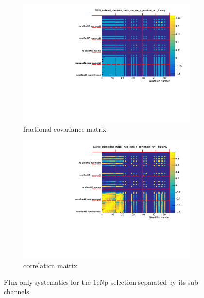 \documentclass[a4paper]{article}
\begin{document}
\begin{figure}[ht] 
\begin{center}
    \begin{subfigure}[b]{0.45\textwidth}
    \centering
    \includegraphics[width=1.00\textwidth]{CovarianceMatrices/SBNfit_fractional_covariance_matrix_nue_reco_e_genietune_run1_fluxonly.pdf}
    \caption{fractional covariance matrix}
    \end{subfigure}
    \begin{subfigure}[b]{0.45\textwidth}
    \centering
    \includegraphics[width=1.00\textwidth]{CovarianceMatrices/SBNfit_correlation_matrix_nue_reco_e_genietune_run1_fluxonly.pdf}
    \caption{correlation matrix}
    \end{subfigure}
\caption{\label{fig:fluxmatrices} Flux only systematics for the 1eNp selection separated by its sub-channels}
\end{center}
\end{figure}
\end{document}
